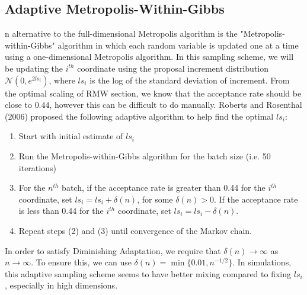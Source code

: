 \documentclass[twoside]{article}
\begin{document}
\subsection{Adaptive Metropolis-Within-Gibbs}
n alternative to the full-dimensional Metropolis algorithm is the "Metropolis-within-Gibbs" algorithm in which each random variable is updated one at a time using a one-dimensional Metropolis algorithm. In this sampling scheme, we will be updating the $i^{th}$ coordinate using the proposal increment distribution $\mathcal{N}(0, e^{2ls_i})$, where $ls_i$ is the log of the standard deviation of increment. From the optimal scaling of RMW section, we know that the acceptance rate should be close to $0.44$, however this can be difficult to do manually. Roberts and Rosenthal (2006) proposed the following adaptive algorithm to help find the optimal $ls_i$:
\begin{enumerate}
	\item Start with initial estimate of $ls_i$
	\item Run the Metropolis-within-Gibbs algorithm for the batch size (i.e. 50 iterations)
	\item For the $n^{th}$ batch, if the acceptance rate is greater than 0.44 for the $i^{th}$ coordinate, set $ls_i = ls_i + \delta(n)$, for some $\delta(n) > 0$. If the acceptance rate is less than 0.44 for the $i^{th}$ coordinate, set $ls_i = ls_i - \delta(n)$.
	\item Repeat steps (2) and (3) until convergence of the Markov chain.
\end{enumerate}
In order to satisfy Diminishing Adaptation, we require that $\delta(n) \rightarrow \infty$ as $n \rightarrow \infty$. To ensure this, we can use $\delta(n) = \min \{0.01, n^{-1/2}\}$. In simulations, this adaptive sampling scheme seems to have better mixing compared to fixing $ls_i$, especially in high dimensions.
\end{document}

